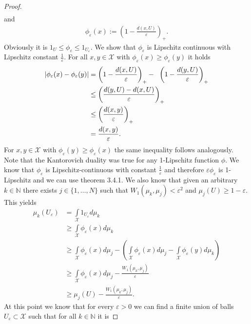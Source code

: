\documentclass[11pt,a4paper]{article}
\begin{document}
\begin{proof}
\begin{align*}
\end{align*}
and
\begin{align*}
\phi_\varepsilon(x):=\left(1-\frac{d(x,U)}{\varepsilon}\right)_{+}.
\end{align*}
Obviously it is $1_U\leq\phi_\varepsilon\leq{}1_{U_\varepsilon}.$ We show that $\phi_\varepsilon$ is Lipschitz continuous with Lipschitz constant $\frac{1}{\varepsilon}.$ For all $x,y\in\mathcal{X}$ with $\phi_\varepsilon(x)\geq\phi_\varepsilon(y)$ it holds 
\begin{align*}
|\phi_\varepsilon(x)-\phi_\varepsilon(y)| & = \left(1-\frac{d(x,U)}{\varepsilon}\right)_{+}- \hspace{0.6em}\left(1-\frac{d(y,U)}{\varepsilon}\right)_{+} \\ &\leq \left(\frac{d(y,U)-d(x,U)}{\varepsilon}\right)_{+} \\&\leq \left(\frac{d(x,y)}{\varepsilon}\right)_{+} \\ &= \frac{d(x,y)}{\varepsilon}.
\end{align*}
For $x,y\in\mathcal{X}$ with $\phi_\varepsilon(y)\geq\phi_\varepsilon(x)$ the same inequality follows analogously.\\
Note that the Kantorovich duality was true for any 1-Lipschitz function $\phi$. We know that $\phi_\varepsilon$ is Lipschitz-continuous with constant $\frac{1}{\varepsilon}$ and therefore $\varepsilon\phi_\varepsilon$ is 1-Lipschitz and we can use theorem 3.4.1. We also know that given an arbitrary $k\in\mathbb{N}$ there exists $j\in\{1,\ldots,N\}$ such that $W_1(\mu_k,\mu_j)<\varepsilon^2$ and $\mu_j(U)\geq{}1-\varepsilon.$ \vspace{1em}\\This yields
\begin{align*}
\mu_k(U_\varepsilon) & = \int\limits_{\mathcal{X}}1_{U_\varepsilon}d\mu_k \\&\geq \int\limits_{\mathcal{X}}\phi_{\varepsilon}(x)d\mu_k \\& \geq\int\limits_{\mathcal{X}}\phi_\varepsilon(x)d\mu_j - \left(\int\limits_{\mathcal{X}}\phi_\varepsilon(x)d\mu_j - \int\limits_{\mathcal{X}}\phi_\varepsilon(y)d\mu_k\right) \\& \geq\int\limits_{\mathcal{X}}\phi_\varepsilon(x)d\mu_j - \frac{W_1(\mu_k,\mu_j)}{\varepsilon} \\& \geq\mu_j(U)-\frac{W_1(\mu_k,\mu_j)}{\varepsilon}.
\end{align*}
At this point we know that for every $\varepsilon>0$ we can find a finite union of balls $U_\varepsilon\subset\mathcal{X}$ such that for all $k\in\mathbb{N}$ it is 

\end{proof}
\end{document}

